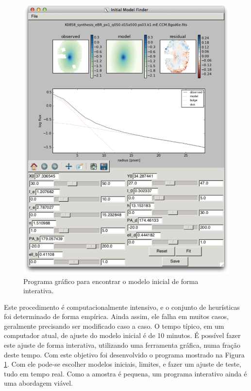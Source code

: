 \begin{figure}
	\includegraphics[width=1.0\columnwidth]{figuras/model_finder}
	\caption[Programa gráfico para encontrar o modelo inicial]
	{Programa gráfico para encontrar o modelo inicial de forma interativa.}
	\label{fig:modelFinder}
\end{figure}

Este procedimento é computacionalmente intensivo, e o conjunto de heurísticas
foi determinado de forma empírica. Ainda assim, ele falha em muitos casos,
geralmente precisando ser modificado caso a caso. O tempo típico, em um
computador atual, de ajuste do modelo inicial é de 10 minutos. É possível fazer
este ajuste de forma interativa, utilizando uma ferramenta gráfica, numa fração
deste tempo. Com este objetivo foi desenvolvido o programa mostrado na Figura
\ref{fig:modelFinder}. Com ele pode-se escolher modelos iniciais, limites, e
fazer um ajuste de teste, tudo em tempo real. Como a amostra é pequena, um
programa interativo ainda é uma abordagem viável.

